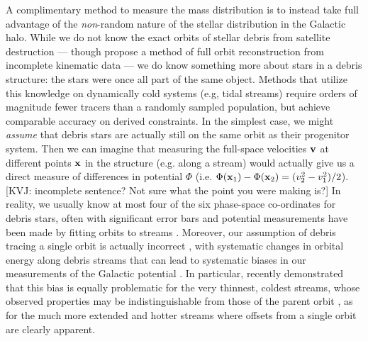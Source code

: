 \documentclass{emulateapj}
\begin{document}
A complimentary method to measure the mass distribution is to instead take full advantage of the {\it non}-random nature of the stellar distribution in the Galactic halo.
While we do not know the exact orbits of  stellar debris from satellite destruction --- though \citet{eyre09b} propose a method of full orbit reconstruction from incomplete kinematic data --- we do know something more about stars in a debris structure: the stars were once all part of the same object.
Methods that utilize this knowledge on dynamically cold systems (e.g, tidal streams) require orders of magnitude fewer tracers than a randomly sampled population, but achieve comparable accuracy on derived constraints.
In the simplest case, we might {\it assume} that debris stars are actually still on the same orbit as their progenitor system.
Then we can imagine that measuring the full-space velocities ${\bf v}$ at different points ${\bf x}$ in the structure (e.g. along a stream) would actually give us a direct
measure of differences in potential $\Phi$ (i.e. $\Phi({\bf x}_1)-\Phi({\bf x}_2)=(v_2^2-v_1^2)/2$).
[KVJ: incomplete sentence? Not sure what the point you were making is?] In reality, we usually know at most four of the six phase-space co-ordinates for debris stars, often with significant error bars and potential measurements have been made by fitting orbits to streams \citep[e.g.,][]{helmi04,johnston05,koposov10,law10}.
Moreover, our assumption of debris tracing a single orbit is actually incorrect \citep[see][for discussions of the orbit distribution in tidal debris]{johnston98,helmi99}, with
systematic changes in orbital energy along debris streams that can lead to systematic biases in our measurements of the Galactic potential \citep{eyre09a,varghese11}.
In particular, \citet{sanders13a} recently demonstrated that this bias is equally problematic for the very thinnest, coldest streams, whose observed properties may be indistinguishable from those of the parent orbit \citep[e.g. such as the globular cluster, GD1 --- see][]{koposov10}, as for the much more extended and hotter streams \citep[e.g. such as debris from the Sagittarius dwarf galaxy --- see][]{majewski03} where offsets from a single orbit are clearly apparent.
\end{document}
